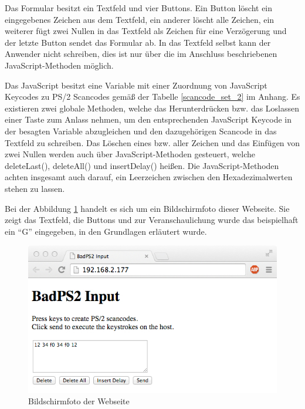Das Formular besitzt ein Textfeld und vier Buttons. Ein Button löscht ein eingegebenes Zeichen aus dem Textfeld, ein anderer löscht alle Zeichen, ein weiterer fügt zwei Nullen in das Textfeld als Zeichen für eine Verzögerung und der letzte Button sendet das Formular ab. In das Textfeld selbst kann der Anwender nicht schreiben, dies ist nur über die im Anschluss beschriebenen JavaScript-Methoden möglich.

Das JavaScript besitzt eine Variable mit einer Zuordnung von JavaScript Keycodes zu PS/2 Scancodes gemäß der Tabelle \ref{scancode_set_2} im Anhang. Es existieren zwei globale Methoden, welche das Herunterdrücken bzw. das Loslassen einer Taste zum Anlass nehmen, um den entsprechenden JavaScript Keycode in der besagten Variable abzugleichen und den dazugehörigen Scancode in das Textfeld zu schreiben. Das Löschen eines bzw. aller Zeichen und das Einfügen von zwei Nullen werden auch über JavaScript-Methoden gesteuert, welche deleteLast(), deleteAll() und insertDelay() heißen. Die JavaScript-Methoden achten insgesamt auch darauf, ein Leerzeichen zwischen den Hexadezimalwerten stehen zu lassen.

Bei der Abbildung \ref{website} handelt es sich um ein Bildschirmfoto dieser Webseite. Sie zeigt das Textfeld, die Buttons und zur Veranschaulichung wurde das beispielhaft ein ``G'' eingegeben, in den Grundlagen erläutert wurde.
\begin{figure}
  \centering
  \includegraphics[width=1\textwidth]{images/website.jpg}
  \caption{Bildschirmfoto der Webseite}
  \label{website}
\end{figure}



